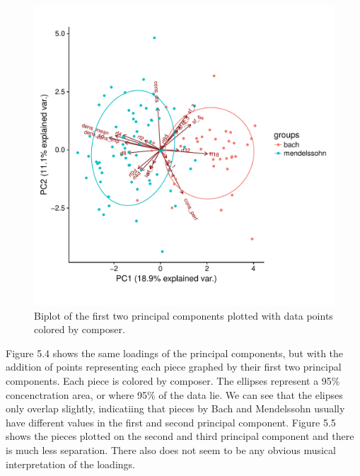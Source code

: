 \documentclass[12pt,twoside]{reedthesis}
\theoremstyle{definition}
\theoremstyle{definition}
\theoremstyle{definition}
\theoremstyle{remark}
\begin{document}
\begin{figure}[H]
\centering
\includegraphics[scale = .5]{images/bi_elipse12.pdf}
\caption{Biplot of the first two principal components plotted with data points colored by composer. }
\label{subd}
\end{figure}
Figure 5.4 shows the same loadings of the principal components, but with
the addition of points representing each piece graphed by their first
two principal components. Each piece is colored by composer. The
ellipses represent a 95\% concenctration area, or where 95\% of the data
lie. We can see that the elipses only overlap slightly, indicatiing that
pieces by Bach and Mendelssohn usually have different values in the
first and second principal component. Figure 5.5 shows the pieces
plotted on the second and third principal component and there is much
less separation. There also does not seem to be any obvious musical
interpretation of the loadings.
\end{document}
